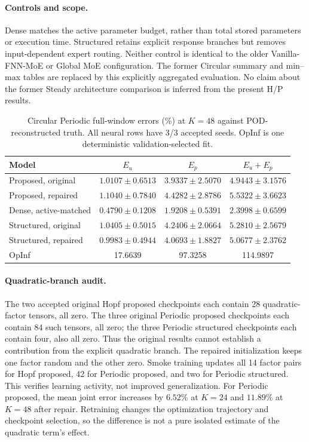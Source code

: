 \documentclass{article}
\begin{document}
\paragraph{Controls and scope.}
Dense matches the active parameter budget, rather than total stored
parameters or execution time. Structured retains explicit response
branches but removes input-dependent expert routing. Neither control
is identical to the older Vanilla-FNN-MoE or Global MoE configuration.
The former Circular summary and min--max tables are replaced by this
explicitly aggregated evaluation. No claim about the former Steady
architecture comparison is inferred from the present H/P results.

\begin{table}[H]
\centering
\caption{Circular Periodic full-window errors (\%) at $K=48$ against
POD-reconstructed truth. All neural rows have 3/3 accepted seeds.
OpInf is one deterministic validation-selected fit.}
\label{tab:circular_full}
\small
\setlength{\tabcolsep}{3pt}
\begin{tabular}{@{}lccc@{}}
\toprule
Model & $E_u$ & $E_p$ & $E_u+E_p$\\
\midrule
Proposed, original & $1.0107\pm0.6513$ & $3.9337\pm2.5070$ & $4.9443\pm3.1576$\\
Proposed, repaired & $1.1040\pm0.7840$ & $4.4282\pm2.8786$ & $5.5322\pm3.6623$\\
Dense, active-matched & $\mathbf{0.4790\pm0.1208}$ & $\mathbf{1.9208\pm0.5391}$ & $\mathbf{2.3998\pm0.6599}$\\
Structured, original & $1.0405\pm0.5015$ & $4.2406\pm2.0664$ & $5.2810\pm2.5679$\\
Structured, repaired & $0.9983\pm0.4944$ & $4.0693\pm1.8827$ & $5.0677\pm2.3762$\\
OpInf & 17.6639 & 97.3258 & 114.9897\\
\bottomrule
\end{tabular}
\end{table}

\paragraph{Quadratic-branch audit.}
The two accepted original Hopf proposed checkpoints each contain 28
quadratic-factor tensors, all zero. The three original Periodic
proposed checkpoints each contain 84 such tensors, all zero; the three
Periodic structured checkpoints each contain four, also all zero.
Thus the original results cannot establish a contribution from the
explicit quadratic branch. The repaired initialization keeps one factor
random and the other zero. Smoke training updates all 14 factor pairs
for Hopf proposed, 42 for Periodic proposed, and two for Periodic
structured. This verifies learning activity, not improved generalization.
For Periodic proposed, the mean joint error increases by $6.52\%$ at
$K=24$ and $11.89\%$ at $K=48$ after repair. Retraining changes the
optimization trajectory and checkpoint selection, so the difference is
not a pure isolated estimate of the quadratic term's effect.
\end{document}
